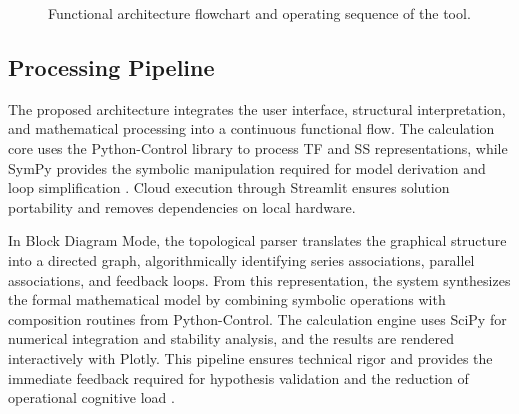 \documentclass[conference]{IEEEtran}
\begin{document}
\begin{figure}[htbp]
    \centering
    \caption{Functional architecture flowchart and operating sequence of the tool.}
    \label{fig:analysis_flowchart}
\end{figure}

\subsection{Processing Pipeline}

The proposed architecture integrates the user interface, structural interpretation, and mathematical processing into a continuous functional flow. The calculation core uses the Python-Control library to process TF and SS representations, while SymPy provides the symbolic manipulation required for model derivation and loop simplification \cite{kim2023}. Cloud execution through Streamlit ensures solution portability and removes dependencies on local hardware.

In Block Diagram Mode, the topological parser translates the graphical structure into a directed graph, algorithmically identifying series associations, parallel associations, and feedback loops. From this representation, the system synthesizes the formal mathematical model by combining symbolic operations with composition routines from Python-Control. The calculation engine uses SciPy for numerical integration and stability analysis, and the results are rendered interactively with Plotly. This pipeline ensures technical rigor and provides the immediate feedback required for hypothesis validation and the reduction of operational cognitive load \cite{guzman2014}.
\end{document}
